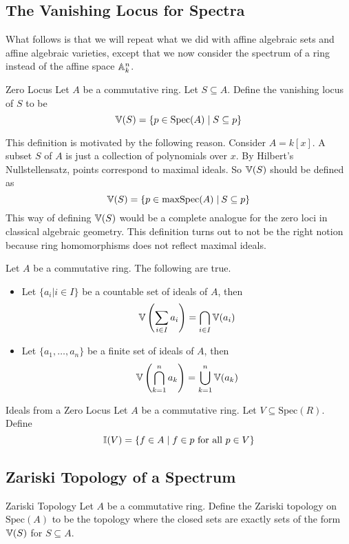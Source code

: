 \documentclass[a4paper]{article}
\begin{document}
\subsection{The Vanishing Locus for Spectra}
What follows is that we will repeat what we did with affine algebraic sets and affine algebraic varieties, except that we now consider the spectrum of a ring instead of the affine space $\mathbb{A}_k^n$. 

\begin{defn}{Zero Locus}{} Let $A$ be a commutative ring. Let $S\subseteq A$. Define the vanishing locus of $S$ to be $$\mathbb{V}(S)=\{p\in\text{Spec}(A)\;|\;S\subseteq p\}$$
\end{defn}

This definition is motivated by the following reason. Consider $A=k[x]$. A subset $S$ of $A$ is just a collection of polynomials over $x$. By Hilbert's Nullstellensatz, points correspond to maximal ideals. So $\mathbb{V}(S)$ should be defined as $$\mathbb{V}(S)=\{p\in\text{maxSpec}(A)\;|\:S\subseteq p\}$$ This way of defining $\mathbb{V}(S)$ would be a complete analogue for the zero loci in classical algebraic geometry. This definition turns out to not be the right notion because ring homomorphisms does not reflect maximal ideals. 

\begin{lmm}{}{} Let $A$ be a commutative ring. The following are true. 
\begin{itemize}
\item Let $\{a_i|i\in I\}$ be a countable set of ideals of $A$, then $$\mathbb{V}\left(\sum_{i\in I}a_i\right)=\bigcap_{i\in I}\mathbb{V}(a_i)$$
\item Let $\{a_1,\dots,a_n\}$ be a finite set of ideals of $A$, then $$\mathbb{V}\left(\bigcap_{k=1}^na_k\right)=\bigcup_{k=1}^n\mathbb{V}(a_k)$$
\end{itemize}
\end{lmm}

\begin{defn}{Ideals from a Zero Locus}{} Let $A$ be a commutative ring. Let $V\subseteq\text{Spec}(R)$. Define $$\mathbb{I}(V)=\{f\in A\;|\;f\in p\text{ for all }p\in V\}$$
\end{defn}

\subsection{Zariski Topology of a Spectrum}
\begin{defn}{Zariski Topology}{} Let $A$ be a commutative ring. Define the Zariski topology on $\text{Spec}(A)$ to be the topology where the closed sets are exactly sets of the form $\mathbb{V}(S)$ for $S\subseteq A$. 
\end{defn}
\end{document}
